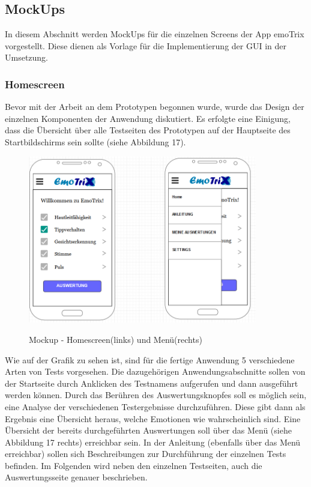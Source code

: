 \subsection{MockUps}
In diesem Abschnitt werden MockUps für die einzelnen Screens der App emoTrix vorgestellt. Diese dienen als Vorlage für die Implementierung der GUI in der Umsetzung.
\subsubsection{Homescreen}
Bevor mit der Arbeit an dem Prototypen begonnen wurde, wurde  das Design der einzelnen Komponenten der Anwendung diskutiert. Es erfolgte eine Einigung, dass die Übersicht über alle Testseiten des Prototypen auf der Hauptseite des Startbildschirms sein sollte (siehe Abbildung 17).
\begin{figure}[h]
	\centering
	\includegraphics[width=10cm]{Bilder/Mockup-Home.png}
	\label{img:Mockup-Home}
	\caption[Mockup - Homescreen(links) und Menü(rechts)]{Mockup - Homescreen(links) und Menü(rechts)}
\end{figure}%
\newline
Wie auf der Grafik zu sehen ist, sind für die fertige Anwendung 5 verschiedene Arten von Tests vorgesehen. Die dazugehörigen Anwendungsabschnitte sollen von der Startseite durch Anklicken des Testnamens aufgerufen und dann ausgeführt werden können. Durch das Berühren des Auswertungsknopfes soll es möglich sein, eine Analyse der verschiedenen Testergebnisse durchzuführen. Diese gibt dann als Ergebnis eine Übersicht heraus, welche Emotionen wie wahrscheinlich sind. Eine Übersicht der bereits durchgeführten Auswertungen soll über das Menü (siehe Abbildung 17 rechts) erreichbar sein. In der Anleitung (ebenfalls über das Menü erreichbar) sollen sich Beschreibungen zur Durchführung der einzelnen Tests befinden.\newline
Im Folgenden wird neben den einzelnen Testseiten, auch die Auswertungsseite genauer beschrieben.  
